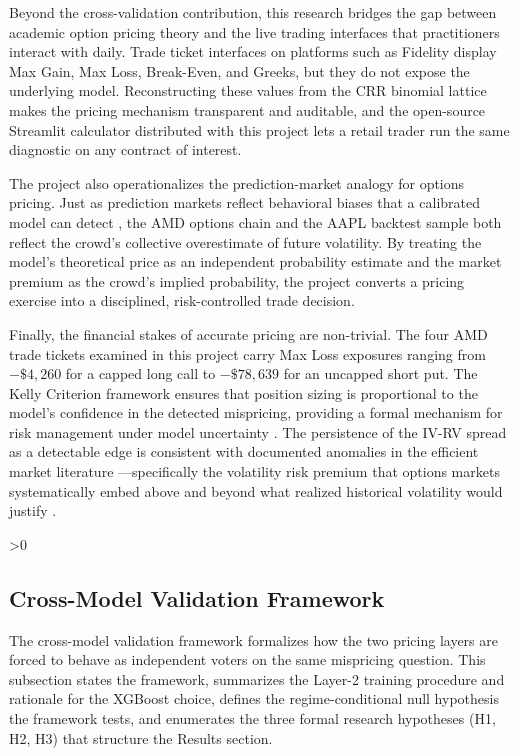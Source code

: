 \documentclass[12pt, letterpaper]{article}
\let\oldsubsection\subsection
\renewcommand{\subsection}{%
  \ifnum\value{subsection}>0 \clearpage\fi
  \oldsubsection
}
\begin{document}
Beyond the cross-validation contribution, this research bridges the
gap between academic option pricing theory and the live trading
interfaces that practitioners interact with daily. Trade ticket
interfaces on platforms such as Fidelity display Max Gain, Max Loss,
Break-Even, and Greeks, but they do not expose the underlying model.
Reconstructing these values from the CRR binomial lattice makes the
pricing mechanism transparent and auditable, and the open-source
Streamlit calculator distributed with this project lets a retail
trader run the same diagnostic on any contract of interest.

The project also operationalizes the prediction-market analogy for
options pricing. Just as prediction markets reflect behavioral biases
that a calibrated model can detect \citep{Wolfers2004}, the AMD
options chain and the AAPL backtest sample both reflect the crowd's
collective overestimate of future volatility. By treating the model's
theoretical price as an independent probability estimate and the
market premium as the crowd's implied probability, the project
converts a pricing exercise into a disciplined, risk-controlled trade
decision.

Finally, the financial stakes of accurate pricing are non-trivial. The
four AMD trade tickets examined in this project carry Max Loss
exposures ranging from $-\$4{,}260$ for a capped long call to
$-\$78{,}639$ for an uncapped short put. The Kelly Criterion framework
ensures that position sizing is proportional to the model's confidence
in the detected mispricing, providing a formal mechanism for risk
management under model uncertainty \citep{MacLean2010}. The
persistence of the IV-RV spread as a detectable edge is consistent
with documented anomalies in the efficient market literature
\citep{Fama1970}---specifically the volatility risk premium that
options markets systematically embed above and beyond what realized
historical volatility would justify \citep{Carr2009}.

\subsection{Cross-Model Validation Framework}
\label{sec:cv_framework}

The cross-model validation framework formalizes how the two pricing
layers are forced to behave as independent voters on the same
mispricing question. This subsection states the framework, summarizes
the Layer-2 training procedure and rationale for the XGBoost choice,
defines the regime-conditional null hypothesis the framework tests,
and enumerates the three formal research hypotheses (H1, H2, H3) that
structure the Results section.
\end{document}
